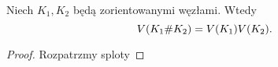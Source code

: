 \begin{proposition}
\label{prp:jones_multiplicative_2}%
%
    Niech $K_1, K_2$ będą zorientowanymi węzłami.
    Wtedy
    \begin{equation}
        V(K_1 \# K_2) = V(K_1) V(K_2).
    \end{equation}
\end{proposition}

\begin{proof}
    Rozpatrzmy sploty
\begin{comment}
    \[
        \begin{tikzpicture}[baseline=-0.65ex,scale=0.07]
        \begin{knot}[clip width=5, flip crossing/.list={1}]
            \strand[semithick] (-22, -5) rectangle (-12, 5);
            \strand[semithick] (22, -5) rectangle (12, 5);

            \strand[semithick,Latex-] (-12, 3) [in=left, out=right] to (12, -3);
            \strand[semithick,Latex-] (12, 3) [in=right, out=left] to (-12, -3);

            \node at (-17, 0) {$K_1$};
            \node at (17, 0) {$K_2$};
        \end{knot}
        \end{tikzpicture}
        \quad\quad
        \begin{tikzpicture}[baseline=-0.65ex,scale=0.07]
        \begin{knot}[clip width=5]
            \strand[semithick] (-22, -5) rectangle (-12, 5);
            \strand[semithick] (22, -5) rectangle (12, 5);

            \strand[semithick,Latex-] (-12, 3) [in=left, out=right] to (12, -3);
            \strand[semithick,Latex-] (12, 3) [in=right, out=left] to (-12, -3);

            \node at (-17, 0) {$K_1$};
            \node at (17, 0) {$K_2$};
        \end{knot}
        \end{tikzpicture}
        \quad\quad
        \begin{tikzpicture}[baseline=-0.65ex,scale=0.07]
        \begin{knot}[clip width=5]
            \strand[semithick] (-22, -5) rectangle (-12, 5);
            \strand[semithick] (-12, -3) [in=down, out=right] to (-2, 0);
            \strand[semithick,Latex-] (-12, 3) [in=up, out=right] to (-2, 0);

            \strand[semithick] (22, -5) rectangle (12, 5);
            \strand[semithick] (12, -3) [in=down, out=left] to (2, 0);
            \strand[semithick,Latex-] (12, 3) [in=up, out=left] to (2, 0);


\end{comment}
\end{proof}
